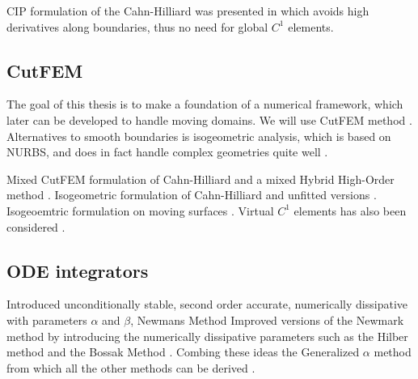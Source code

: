 CIP formulation of the Cahn-Hilliard was presented in \cite{wells2006discontinuous} which avoids high derivatives along boundaries, thus no need for global $C^{1}$ elements.


\subsection{CutFEM}%
\label{sub:cutfem}
The goal of this thesis is to make a foundation of a numerical framework, which later can be developed to handle moving domains. We will use CutFEM method \cite{burman2015cutfem}.
Alternatives to smooth boundaries is isogeometric analysis, which is based on NURBS, and does in fact handle complex geometries quite well \cite{hughes2005isogeometric}.

Mixed CutFEM formulation of Cahn-Hilliard \cite{karatzas2021reduced} and a mixed Hybrid High-Order method \cite{chave2016hybrid}. Isogeometric formulation of Cahn-Hilliard \cite{kastner2016isogeometric, gomez2008isogeometric} and unfitted versions \cite{zhao2017variational}. Isogeoemtric formulation on moving
surfaces \cite{zimmermann2019isogeometric}. Virtual $C^{1}$  elements has also been considered \cite{antonietti2016c}.



\subsection{ODE integrators}%
\label{sub:ode_integrators}

Introduced unconditionally stable, second order accurate, numerically dissipative with parameters $\alpha$ and $ \beta $,  Newmans Method \cite{newmark1959method}
Improved versions of the Newmark method by introducing the numerically dissipative parameters such as the Hilber method and the Bossak Method \cite{hilber1977improved, wood1980alpha}. Combing these ideas the Generalized $\alpha $ method from which all the other methods can be derived \cite{chung1993time}.


